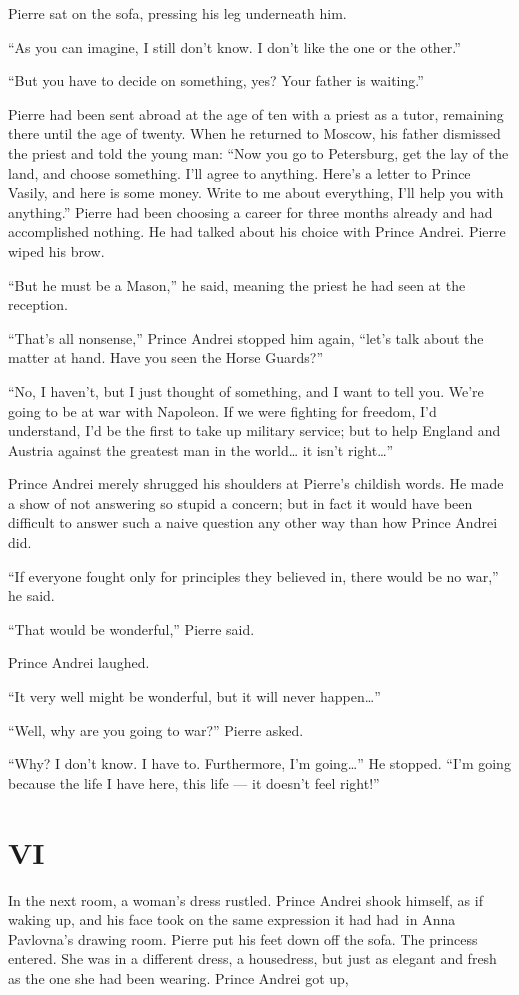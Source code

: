 Pierre sat on the sofa, pressing his leg underneath him.

``As you can imagine, I still don't know. I don't like the one or the
other.''

``But you have to decide on something, yes? Your father is waiting.''

Pierre had been sent abroad at the age of ten with a priest as a
tutor, remaining there until the age of twenty. When he returned to
Moscow, his father dismissed the priest and told the young man: ``Now
you go to Petersburg, get the lay of the land, and choose
something. I'll agree to anything. Here's a letter to Prince Vasily,
and here is some money. Write to me about everything, I'll help you
with anything.'' Pierre had been choosing a career for three months
already and had accomplished nothing. He had talked about his choice
with Prince Andrei. Pierre wiped his brow.

``But he must be a Mason,'' he said, meaning the priest he had seen at
the reception.

``That's all nonsense,'' Prince Andrei stopped him again, ``let's talk
about the matter at hand. Have you seen the Horse Guards?''

``No, I haven't, but I just thought of something, and I want to tell
you. We're going to be at war with Napoleon. If we were fighting for
freedom, I'd understand, I'd be the first to take up military service;
but to help England and Austria against the greatest man in the
world\ldots{} it isn't right\ldots{}''

Prince Andrei merely shrugged his shoulders at Pierre's childish
words. He made a show of not answering so stupid a concern; but in
fact it would have been difficult to answer such a naive question any
other way than how Prince Andrei did.

``If everyone fought only for principles they believed in, there would
be no war,'' he said.

``That would be wonderful,'' Pierre said.

Prince Andrei laughed.

``It very well might be wonderful, but it will never happen\ldots{}''

``Well, why are you going to war?'' Pierre asked.

``Why? I don't know. I have to. Furthermore, I'm going\ldots{}'' He
stopped. ``I'm going because the life I have here, this life --- it
doesn't feel right!''

\section{VI} %

In the next room, a woman's dress rustled. Prince Andrei shook
himself, as if waking up, and his face took on the same
expression it had had\ in Anna Pavlovna's drawing
room. Pierre put his feet down off the sofa. The princess entered. She
was in a different dress, a housedress, but just as elegant and fresh
as the one she had been wearing. Prince Andrei got up, 